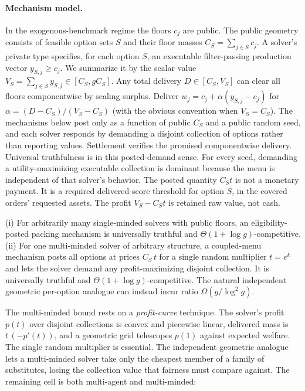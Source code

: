 \documentclass{llncs}
\begin{document}
\paragraph{Mechanism model.}
In the exogenous-benchmark regime the floors $c_j$ are public. The public
geometry consists of feasible option sets $S$ and their floor masses
$C_S=\sum_{j\in S}c_j$. A solver's private type specifies, for each
option $S$, an executable filter-passing production vector
$y_{S,j}\ge c_j$. We summarize it by the scalar value
$V_S=\sum_{j\in S}y_{S,j}\in[C_S,gC_S]$. Any total delivery
$D\in[C_S,V_S]$ can clear all floors componentwise by scaling surplus.
Deliver $w_j=c_j+\alpha(y_{S,j}-c_j)$ for
$\alpha=(D-C_S)/(V_S-C_S)$ (with the obvious convention when
$V_S=C_S$). The mechanisms below post only as a function of public
$C_S$ and a public random seed, and each solver responds by demanding a
disjoint collection of options rather than reporting values. Settlement
verifies the promised componentwise delivery. Universal truthfulness is
in this posted-demand sense. For every seed, demanding a
utility-maximizing executable collection is dominant because the menu is
independent of that solver's behavior.
The posted quantity $C_St$ is not a monetary payment. It is a required
delivered-score threshold for option $S$, in the covered orders' requested
assets. The profit $V_S-C_St$ is retained raw value, not cash.

\begin{theorem}\label{thm:lift}
(i) For arbitrarily many single-minded solvers with public floors, an
eligibility-posted packing mechanism is universally truthful and
$\Theta(1+\log g)$-competitive. (ii) For one multi-minded solver of
arbitrary structure, a coupled-menu mechanism posts all options at
prices $C_S\,t$ for a single random multiplier $t=e^k$ and lets the solver
demand any profit-maximizing disjoint collection. It is universally
truthful and $\Theta(1+\log g)$-competitive. The natural independent
geometric per-option analogue can instead incur ratio
$\Omega(g/\log^2 g)$.
\end{theorem}

The multi-minded bound rests on a \emph{profit-curve} technique. The
solver's profit $p(t)$ over disjoint collections is convex and piecewise
linear, delivered mass is $t\,(-p'(t))$, and a geometric grid telescopes
$p(1)$ against expected welfare. The single random multiplier is
essential. The independent geometric analogue lets a multi-minded solver
take only the cheapest member of a family of substitutes, losing the
collection value that fairness must compare against. The remaining cell
is both multi-agent and multi-minded:
\end{document}
